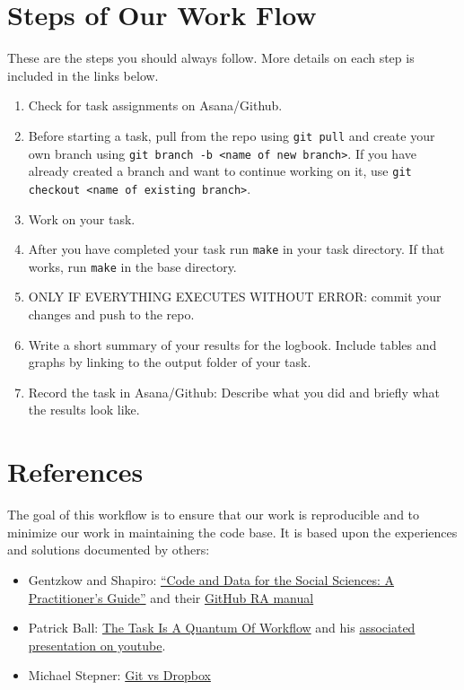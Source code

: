 \section{Steps of Our Work Flow}

These are the steps you should always follow. More details on each step is included in the links below.

\begin{enumerate}
	\item Check for task assignments on Asana/Github.
	\item Before starting a task, pull from the repo using \texttt{git pull} and create your own branch using \texttt{git branch -b <name of new branch>}. If you have already created a branch and want to continue working on it, use \texttt{git checkout <name of existing branch>}. 
	\item Work on your task.
	\item After you have completed your task run \texttt{make} in your task directory. If that works, run \texttt{make} in the base directory.
	\item ONLY IF EVERYTHING EXECUTES WITHOUT ERROR: commit your changes and push to the repo.
	\item Write a short summary of your results for the logbook. Include tables and graphs by linking to the output folder of your task.
	\item Record the task in Asana/Github: Describe what you did and briefly what the results look like.
\end{enumerate}

\section{References}

The goal of this workflow is to ensure that our work is reproducible and to minimize our work in maintaining the code base. It is based upon the experiences and solutions documented by others:

\begin{itemize}
	\item Gentzkow and Shapiro: \href{https://web.stanford.edu/~gentzkow/research/CodeAndData.pdf}{``Code and Data for the Social Sciences: A Practitioner's Guide''} and their \href{https://github.com/gslab-econ/ra-manual/wiki/Introduction}{GitHub RA manual}
	\item Patrick Ball: \href{https://hrdag.org/2016/06/14/the-task-is-a-quantum-of-workflow/}{The Task Is A Quantum Of Workflow} and his \href{https://www.youtube.com/watch?v=ZSunU9GQdcI}{associated presentation on youtube}.
	\item Michael Stepner: \href{https://michaelstepner.com/blog/git-vs-dropbox/}{Git vs Dropbox}
\end{itemize} 

